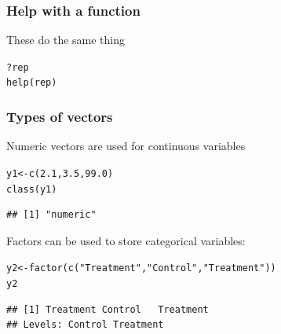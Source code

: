 \documentclass[color=usenames,dvipsnames]{beamer}\usepackage[]{graphicx}\usepackage[]{color}
\makeatletter
\newcommand{\hlnum}[1]{\textcolor[rgb]{0.69,0.494,0}{#1}}%
\newcommand{\hlstr}[1]{\textcolor[rgb]{0.749,0.012,0.012}{#1}}%
\newcommand{\hlopt}[1]{\textcolor[rgb]{0,0,0}{#1}}%
\newcommand{\hlstd}[1]{\textcolor[rgb]{0,0,0}{#1}}%
\newcommand{\hlkwb}[1]{\textcolor[rgb]{0,0.341,0.682}{#1}}%
\newcommand{\hlkwd}[1]{\textcolor[rgb]{0.004,0.004,0.506}{#1}}%
\newenvironment{kframe}{%
 \def\at@end@of@kframe{}%
 \ifinner\ifhmode%
  \def\at@end@of@kframe{\end{minipage}}%
  \begin{minipage}{\columnwidth}%
 \fi\fi%
 \def\FrameCommand##1{\hskip\@totalleftmargin \hskip-\fboxsep
 \colorbox{shadecolor}{##1}\hskip-\fboxsep
     \hskip-\linewidth \hskip-\@totalleftmargin \hskip\columnwidth}%
 \MakeFramed {\advance\hsize-\width
   \@totalleftmargin\z@ \linewidth\hsize
   \@setminipage}}%
 {\par\unskip\endMakeFramed%
 \at@end@of@kframe}
\newenvironment{knitrout}{}{} %
\makeatother
\begin{document}
\begin{frame}[fragile]
  \frametitle{Help with a function}
\LARGE
These do the same thing
\begin{knitrout}
\color{fgcolor}\begin{kframe}
\begin{alltt}
\hlopt{?}\hlstd{rep}
\hlkwd{help}\hlstd{(rep)}
\end{alltt}
\end{kframe}
\end{knitrout}
\end{frame}




\begin{frame}[fragile]
  \frametitle{Types of vectors}
  Numeric vectors are used for continuous variables
\begin{knitrout}\small
{}\color{fgcolor}\begin{kframe}
\begin{alltt}
\hlstd{y1} \hlkwb{<-} \hlkwd{c}\hlstd{(}\hlnum{2.1}\hlstd{,} \hlnum{3.5}\hlstd{,} \hlnum{99.0}\hlstd{)}
\hlkwd{class}\hlstd{(y1)}
\end{alltt}
\begin{verbatim}
## [1] "numeric"
\end{verbatim}
\end{kframe}
\end{knitrout}
\pause \vfill
Factors can be used to store categorical variables: %
\begin{knitrout}\small
{}\color{fgcolor}\begin{kframe}
\begin{alltt}
\hlstd{y2} \hlkwb{<-} \hlkwd{factor}\hlstd{(}\hlkwd{c}\hlstd{(}\hlstr{"Treatment"}\hlstd{,} \hlstr{"Control"}\hlstd{,} \hlstr{"Treatment"}\hlstd{))}
\hlstd{y2}
\end{alltt}
\begin{verbatim}
## [1] Treatment Control   Treatment
## Levels: Control Treatment
\end{verbatim}
\end{kframe}
\end{knitrout}
\end{frame}
\end{document}
